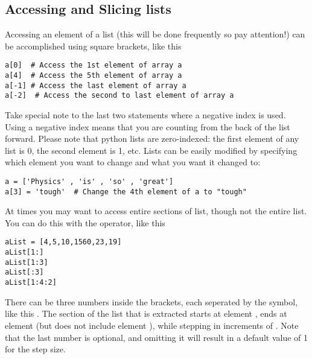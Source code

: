 \subsection*{Accessing and Slicing lists}
Accessing an element of a list (this will be done frequently so pay
attention!) can be accomplished using square brackets, like this
\begin{Verbatim}
a[0]  # Access the 1st element of array a
a[4]  # Access the 5th element of array a
a[-1] # Access the last element of array a
a[-2]  # Access the second to last element of array a
\end{Verbatim}
Take special note to the last two statements where a negative index is
used.  Using a negative index means that you are counting from the
back of the list forward.
Please note that python lists are zero-indexed: the first element of
any list is 0, the second element is 1, etc.  Lists can be easily
modified by specifying which element you want to change and what you
want it changed to:
\begin{Verbatim}
a = ['Physics' , 'is' , 'so' , 'great']
a[3] = 'tough'  # Change the 4th element of a to "tough"
\end{Verbatim}
At times you may want to access entire sections of list, though not
the entire list.  You can do this with the \code{:} operator, like
this
\begin{Verbatim}
aList = [4,5,10,1560,23,19]
aList[1:]
aList[1:3]
aList[:3]
aList[1:4:2]
\end{Verbatim}
There can be three numbers inside the brackets, each seperated by the
\code{:} symbol, like this \code{[x:y:z]}.  The section of the
list that is extracted starts at element , ends at element
 (but does not include element ), while stepping in
increments of .  Note that the last number is optional, and
omitting it will result in a default value of 1 for the step size.


